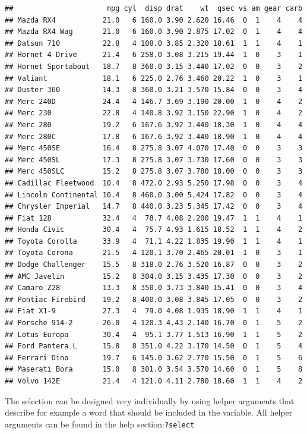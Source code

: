 \documentclass[]{report}
\begin{document}
\begin{verbatim}
##                      mpg cyl  disp drat    wt  qsec vs am gear carb
## Mazda RX4           21.0   6 160.0 3.90 2.620 16.46  0  1    4    4
## Mazda RX4 Wag       21.0   6 160.0 3.90 2.875 17.02  0  1    4    4
## Datsun 710          22.8   4 108.0 3.85 2.320 18.61  1  1    4    1
## Hornet 4 Drive      21.4   6 258.0 3.08 3.215 19.44  1  0    3    1
## Hornet Sportabout   18.7   8 360.0 3.15 3.440 17.02  0  0    3    2
## Valiant             18.1   6 225.0 2.76 3.460 20.22  1  0    3    1
## Duster 360          14.3   8 360.0 3.21 3.570 15.84  0  0    3    4
## Merc 240D           24.4   4 146.7 3.69 3.190 20.00  1  0    4    2
## Merc 230            22.8   4 140.8 3.92 3.150 22.90  1  0    4    2
## Merc 280            19.2   6 167.6 3.92 3.440 18.30  1  0    4    4
## Merc 280C           17.8   6 167.6 3.92 3.440 18.90  1  0    4    4
## Merc 450SE          16.4   8 275.8 3.07 4.070 17.40  0  0    3    3
## Merc 450SL          17.3   8 275.8 3.07 3.730 17.60  0  0    3    3
## Merc 450SLC         15.2   8 275.8 3.07 3.780 18.00  0  0    3    3
## Cadillac Fleetwood  10.4   8 472.0 2.93 5.250 17.98  0  0    3    4
## Lincoln Continental 10.4   8 460.0 3.00 5.424 17.82  0  0    3    4
## Chrysler Imperial   14.7   8 440.0 3.23 5.345 17.42  0  0    3    4
## Fiat 128            32.4   4  78.7 4.08 2.200 19.47  1  1    4    1
## Honda Civic         30.4   4  75.7 4.93 1.615 18.52  1  1    4    2
## Toyota Corolla      33.9   4  71.1 4.22 1.835 19.90  1  1    4    1
## Toyota Corona       21.5   4 120.1 3.70 2.465 20.01  1  0    3    1
## Dodge Challenger    15.5   8 318.0 2.76 3.520 16.87  0  0    3    2
## AMC Javelin         15.2   8 304.0 3.15 3.435 17.30  0  0    3    2
## Camaro Z28          13.3   8 350.0 3.73 3.840 15.41  0  0    3    4
## Pontiac Firebird    19.2   8 400.0 3.08 3.845 17.05  0  0    3    2
## Fiat X1-9           27.3   4  79.0 4.08 1.935 18.90  1  1    4    1
## Porsche 914-2       26.0   4 120.3 4.43 2.140 16.70  0  1    5    2
## Lotus Europa        30.4   4  95.1 3.77 1.513 16.90  1  1    5    2
## Ford Pantera L      15.8   8 351.0 4.22 3.170 14.50  0  1    5    4
## Ferrari Dino        19.7   6 145.0 3.62 2.770 15.50  0  1    5    6
## Maserati Bora       15.0   8 301.0 3.54 3.570 14.60  0  1    5    8
## Volvo 142E          21.4   4 121.0 4.11 2.780 18.60  1  1    4    2
\end{verbatim}

The selection can be designed very individually by using helper
arguments that describe for example a word that should be included in
the variable. All helper arguments can be found in the help
section:\texttt{?select}
\end{document}
